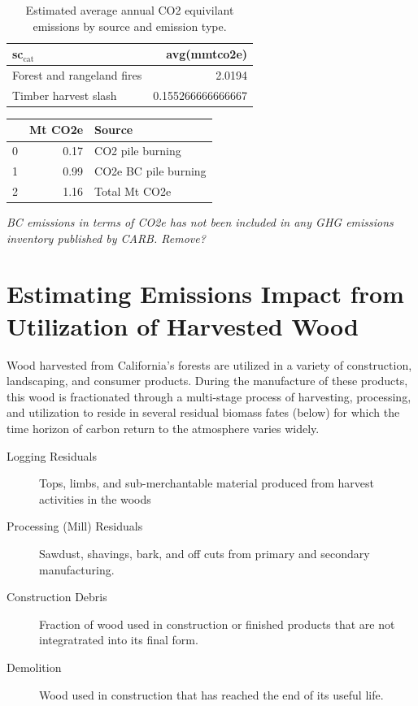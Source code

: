 \documentclass[a4paper]{article}
\begin{document}
\begin{table}[htb]
\caption{Estimated average annual CO2 equivilant emissions by source and emission type. \label{carb1990_co2e}}
\centering
\begin{tabular}{lr}
sc$_{\text{cat}}$ & avg(mmtco2e)\\
\hline
Forest and rangeland fires & 2.0194\\
Timber harvest slash & 0.155266666666667\\
\end{tabular}
\end{table}

\begin{center}
\begin{tabular}{rrl}
 & Mt CO2e & Source\\
\hline
0 & 0.17 & CO2 pile burning\\
1 & 0.99 & CO2e BC pile burning\\
2 & 1.16 & Total Mt CO2e\\
\end{tabular}
\end{center}

\emph{\emph{BC emissions in terms of CO2e has not been included in any GHG emissions
inventory published by CARB. Remove?}}

\section{Estimating Emissions Impact from Utilization of Harvested Wood}
\label{sec-3}
Wood harvested from California's forests are utilized in a variety of construction,
landscaping, and consumer products. During the manufacture of these products, this wood is fractionated 
through a multi-stage process of harvesting, processing, and utilization to reside in several residual biomass fates (below) for which the time horizon of carbon return to the atmosphere varies widely. 

\begin{description}
\item[{Logging Residuals}] Tops, limbs, and sub-merchantable material produced from harvest activities in the woods
\item[{Processing (Mill) Residuals}] Sawdust, shavings, bark, and off cuts from primary and secondary manufacturing.
\item[{Construction Debris}] Fraction of wood used in construction or  finished products that are not integratrated into its final form.
\item[{Demolition}] Wood used in construction that has reached the end of its useful life.
\end{description}
\end{document}
